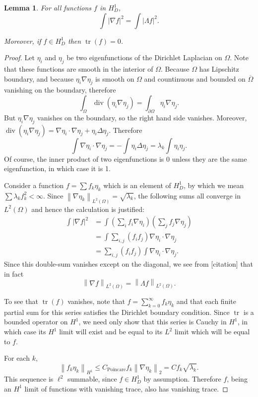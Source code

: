 \documentclass[11pt]{amsart}
\newtheorem{lemma}[theorem]{Lemma}
\theoremstyle{remark}
\newcommand{\norm}[1]{\left\lVert#1\right\rVert}
\newcommand{\paren}[1]{\left( #1 \right)}
\newcommand{\abs}[1]{\left\lvert #1 \right\rvert}
\DeclareMathOperator{\trace}{tr}
\newcommand{\del}{\partial}
\newcommand{\grad}{\nabla}
\renewcommand{\div}{\operatorname{div}}
\newcommand{\Laplace}{\Delta}
\newcommand{\eigen}[1]{\eta_{#1}} %
\begin{document}
\begin{lemma}
For all functions $f$ in $H_D^1$,
\[ \int \abs{\grad f}^2 = \int \abs{\Lambda f}^2. \]

Moreover, if $f \in H_D^1$ then $\trace(f)=0$.  
\end{lemma}

\begin{proof}
Let $\eigen{i}$ and $\eigen{j}$ be two eigenfunctions of the Dirichlet Laplacian on $\Omega$.  Note that these functions are smooth in the interior of $\Omega$.  Because $\Omega$ has Lipschitz boundary, and because $\eigen{i} \grad \eigen{j}$ is smooth on $\Omega$ and countinuous and bounded on $\overline{\Omega}$ vanishing on the boundary, therefore 
\[ \int_\Omega \div(\eigen{i} \grad \eigen{j}) = \int_{\del \Omega} \eigen{i} \grad \eigen{j}. \]
But $\eigen{i} \grad \eigen{j}$ vanishes on the boundary, so the right hand side vanishes.  Moreover, $\div(\eigen{i} \grad \eigen{j}) = \grad \eigen{i} \cdot \grad \eigen{j} + \eigen{i} \Laplace \eigen{j}$.  Therefore
\[ \int \grad \eigen{i} \cdot \grad \eigen{j} = - \int \eigen{i} \Laplace \eigen{j} = \lambda_k \int \eigen{i} \eigen{j}. \]
Of course, the inner product of two eigenfunctions is 0 unless they are the same eigenfunction, in which case it is 1.  

Consider a function $f = \sum f_k \eigen{k}$ which is an element of $H_D^1$, by which we mean $\sum \lambda_k f_k^2 < \infty$.  Since $\norm{\grad \eigen{k}}_{L^2(\Omega)} = \sqrt{\lambda_k}$, the following sums all converge in $L^2(\Omega)$ and hence the calculation is justified:
\begin{align*}
\int \abs{\grad f}^2 &= \int \paren{\sum_i f_i \grad \eigen{i} } \paren{\sum_j f_j \grad \eigen{j}}
\\ &= \int \sum_{i,j} (f_i f_j) \grad \eigen{i} \cdot \grad \eigen{j}
\\ &= \sum_{i,j} (f_i f_j) \int \grad \eigen{i} \cdot \grad \eigen{j}.
\end{align*}
Since this double-sum vanishes except on the diagonal, we see from [citation] that in fact
\[ \norm{\grad f}_{L^2(\Omega)} = \norm{\Lambda f}_{L^2(\Omega)}. \]

To see that $\trace(f)$ vanishes, note that $f = \sum_{k=0}^\infty f_k \eigen{k}$ and that each finite partial sum for this series satisfies the Dirichlet boundary condition.  Since $\trace$ is a bounded operator on $H^1$, we need only show that this series is Cauchy in $H^1$, in which case its $H^1$ limit will exist and be equal to its $L^2$ limit which will be equal to $f$.  

For each $k$,
\[ \norm{ f_k \eigen{k} }_{H^1} \leq C_\textrm{Poincare} f_k \norm{\grad \eigen{k}}_2 = C f_k \sqrt{\lambda_k}. \]
This sequence is $\ell^2$ summable, since $f \in H_D^1$ by assumption.  Therefore $f$, being an $H^1$ limit of functions with vanishing trace, also has vanishing trace.  
\end{proof}
\end{document}
